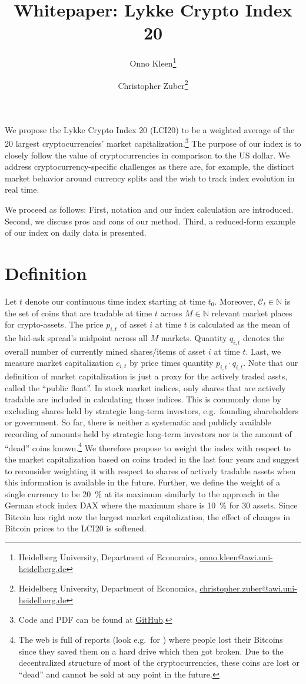 \documentclass[11pt]{article}
\title{Whitepaper: Lykke Crypto Index 20}
\author{
Onno Kleen\thanks{Heidelberg University, Department of Economics, \href{mailto:onno.kleen@awi.uni-heidelberg.de}{onno.kleen@awi.uni-heidelberg.de}}
\and
Christopher Zuber\thanks{Heidelberg University, Department of Economics, \href{mailto:christopher.zuber@awi.uni-heidelberg.de}{christopher.zuber@awi.uni-heidelberg.de}}
}
\begin{document}
\maketitle


We propose the Lykke Crypto Index 20 (LCI20) to be a weighted average of the 20 largest cryptocurrencies' market capitalization.\footnote{Code and PDF can be found at \href{https://github.com/onnokleen/crypto-index}{GitHub}.}
The purpose of our index is to closely follow the value of cryptocurrencies in comparison to the US dollar.
We address cryptocurrency-specific challenges as there are, for example, the distinct market behavior around currency splits and the wish to track index evolution in real time.

We proceed as follows:
First, notation and our index calculation are introduced.
Second, we discuss pros and cons of our method.
Third, a reduced-form example of our index on daily data is presented.


\section{Definition}

Let $t$ denote our continuous time index starting at time $t_0$.
Moreover, $\mathcal{C}_t \in \mathbb{N}$ is the set of coins that are tradable at time $t$ across $M \in \mathbb{N}$ relevant market places for crypto-assets.
The price $p_{i,t}$ of asset $i$ at time $t$ is calculated as the mean of the bid-ask spread's midpoint across all $M$ markets.
Quantity $q_{i,t}$ denotes the overall number of currently mined shares/items of asset $i$ at time $t$.
Last, we measure market capitalization $c_{i,t}$ by price times quantity $p_{i,t} \cdot q_{i,t}$.
Note that our definition of market capitalization is just a proxy for the actively traded assts, called the ``public float''.
In stock market indices, only shares that are actively tradable are included in calculating those indices.
This is commonly done by excluding shares held by strategic long-term investors, e.g.\ founding shareholders or government.
So far, there is neither a systematic and publicly available recording of amounts held by strategic long-term investors nor is the amount of ``dead'' coins known.\footnote{The web is full of reports (look e.g.\ for \citeauthor{Zombiecoins}) where people lost their Bitcoins since they saved them on a hard drive which then got broken. Due to the decentralized structure of most of the cryptocurrencies, these coins are lost or ``dead'' and cannot be sold at any point in the future.}
We therefore propose to weight the index with respect to the market capitalization based on coins traded in the last four years and suggest to reconsider weighting it with respect to shares of actively tradable assets when this information is available in the future.
Further, we define the weight of a single currency to be 20~\% at its maximum similarly to the approach in the German stock index DAX where the maximum share is 10~\% for 30 assets.
Since Bitcoin has right now the largest market capitalization, the effect of changes in Bitcoin prices to the LCI20 is softened.
\end{document}
